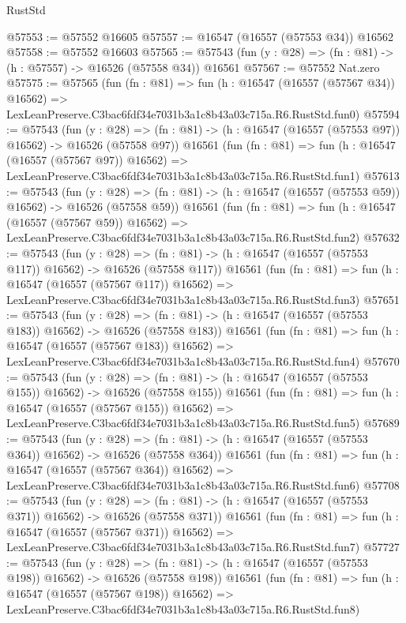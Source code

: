 \begin{lexlean}{RustStd}
\begin{coremodule}
@57553 := @57552 @16605
@57557 := @16547 (@16557 (@57553 @34)) @16562
@57558 := @57552 @16603
@57565 := @57543 (fun (y : @28) => (fn : @81) -> (h : @57557) -> @16526 (@57558 @34)) @16561
@57567 := @57552 Nat.zero
@57575 := @57565
    (fun (fn : @81) =>
    fun (h : @16547 (@16557 (@57567 @34)) @16562) =>
    LexLeanPreserve.C3bac6fdf34e7031b3a1c8b43a03c715a.R6.RustStd.fun0)
@57594 := @57543
    (fun (y : @28) =>
    (fn : @81) -> (h : @16547 (@16557 (@57553 @97)) @16562) -> @16526 (@57558 @97))
    @16561
    (fun (fn : @81) =>
    fun (h : @16547 (@16557 (@57567 @97)) @16562) =>
    LexLeanPreserve.C3bac6fdf34e7031b3a1c8b43a03c715a.R6.RustStd.fun1)
@57613 := @57543
    (fun (y : @28) =>
    (fn : @81) -> (h : @16547 (@16557 (@57553 @59)) @16562) -> @16526 (@57558 @59))
    @16561
    (fun (fn : @81) =>
    fun (h : @16547 (@16557 (@57567 @59)) @16562) =>
    LexLeanPreserve.C3bac6fdf34e7031b3a1c8b43a03c715a.R6.RustStd.fun2)
@57632 := @57543
    (fun (y : @28) =>
    (fn : @81) -> (h : @16547 (@16557 (@57553 @117)) @16562) -> @16526 (@57558 @117))
    @16561
    (fun (fn : @81) =>
    fun (h : @16547 (@16557 (@57567 @117)) @16562) =>
    LexLeanPreserve.C3bac6fdf34e7031b3a1c8b43a03c715a.R6.RustStd.fun3)
@57651 := @57543
    (fun (y : @28) =>
    (fn : @81) -> (h : @16547 (@16557 (@57553 @183)) @16562) -> @16526 (@57558 @183))
    @16561
    (fun (fn : @81) =>
    fun (h : @16547 (@16557 (@57567 @183)) @16562) =>
    LexLeanPreserve.C3bac6fdf34e7031b3a1c8b43a03c715a.R6.RustStd.fun4)
@57670 := @57543
    (fun (y : @28) =>
    (fn : @81) -> (h : @16547 (@16557 (@57553 @155)) @16562) -> @16526 (@57558 @155))
    @16561
    (fun (fn : @81) =>
    fun (h : @16547 (@16557 (@57567 @155)) @16562) =>
    LexLeanPreserve.C3bac6fdf34e7031b3a1c8b43a03c715a.R6.RustStd.fun5)
@57689 := @57543
    (fun (y : @28) =>
    (fn : @81) -> (h : @16547 (@16557 (@57553 @364)) @16562) -> @16526 (@57558 @364))
    @16561
    (fun (fn : @81) =>
    fun (h : @16547 (@16557 (@57567 @364)) @16562) =>
    LexLeanPreserve.C3bac6fdf34e7031b3a1c8b43a03c715a.R6.RustStd.fun6)
@57708 := @57543
    (fun (y : @28) =>
    (fn : @81) -> (h : @16547 (@16557 (@57553 @371)) @16562) -> @16526 (@57558 @371))
    @16561
    (fun (fn : @81) =>
    fun (h : @16547 (@16557 (@57567 @371)) @16562) =>
    LexLeanPreserve.C3bac6fdf34e7031b3a1c8b43a03c715a.R6.RustStd.fun7)
@57727 := @57543
    (fun (y : @28) =>
    (fn : @81) -> (h : @16547 (@16557 (@57553 @198)) @16562) -> @16526 (@57558 @198))
    @16561
    (fun (fn : @81) =>
    fun (h : @16547 (@16557 (@57567 @198)) @16562) =>
    LexLeanPreserve.C3bac6fdf34e7031b3a1c8b43a03c715a.R6.RustStd.fun8)

\end{coremodule}
\end{lexlean}
